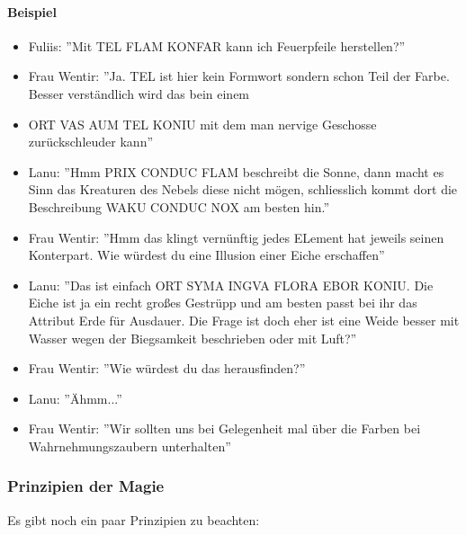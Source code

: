 \documentclass{article}
\begin{document}
\paragraph{Beispiel}

\begin{itemize}
\item Fuliis: ''Mit TEL FLAM KONFAR kann ich Feuerpfeile herstellen?''
\item Frau Wentir: ''Ja. TEL ist hier kein Formwort sondern schon Teil der Farbe. Besser verständlich wird das bein einem 
\item ORT VAS AUM TEL KONIU mit dem man nervige Geschosse zurückschleuder kann''
\item Lanu: ''Hmm PRIX CONDUC FLAM beschreibt die Sonne, dann macht es Sinn das Kreaturen des Nebels diese nicht mögen, schliesslich kommt dort die Beschreibung WAKU CONDUC NOX am besten hin.''
\item Frau Wentir: ''Hmm das klingt vernünftig jedes ELement hat jeweils seinen Konterpart. Wie würdest du eine Illusion einer Eiche erschaffen''
\item Lanu: ''Das ist einfach ORT SYMA INGVA FLORA EBOR KONIU. Die Eiche ist ja ein recht großes Gestrüpp und am besten passt bei ihr das Attribut Erde für Ausdauer. Die Frage ist doch eher ist eine Weide besser mit Wasser wegen der Biegsamkeit beschrieben oder mit Luft?''
\item Frau Wentir: ''Wie würdest du das herausfinden?''
\item Lanu: ''Ähmm...''
\item Frau Wentir: ''Wir sollten uns bei Gelegenheit mal über die Farben bei Wahrnehmungszaubern unterhalten''
\end{itemize}

\subsubsection{Prinzipien der Magie}

Es gibt noch ein paar Prinzipien zu beachten:
\end{document}
